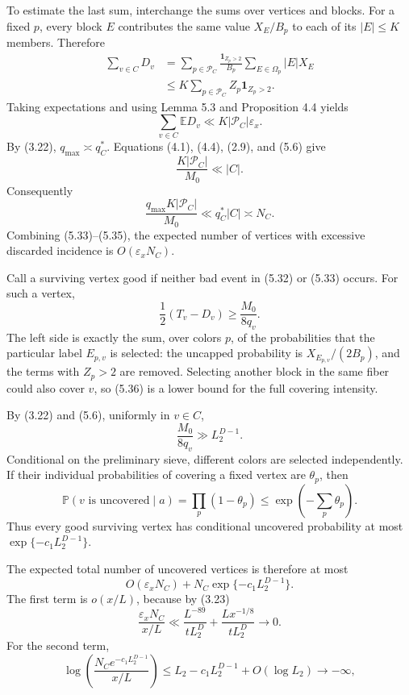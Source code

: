 \documentclass[10pt,letterpaper]{article}
\newcommand{\PP}{\mathbb{P}}
\newcommand{\EE}{\mathbb{E}}
\newcommand{\PC}{\mathcal{P}_C}
\newcommand{\ind}{\mathbf{1}}
\begin{document}
To estimate the last sum, interchange the sums over vertices and blocks. For a fixed $p$, every block $E$
contributes the same value $X_E/B_p$ to each of its $|E|\le K$ members. Therefore
\[
\begin{aligned}
\sum_{v\in C}D_v&=\sum_{p\in\PC}\frac{\ind_{Z_p>2}}{B_p}\sum_{E\in\Omega_p}|E|X_E\\
&\le K\sum_{p\in\PC}Z_p\ind_{Z_p>2}.
\end{aligned}
\]
Taking expectations and using Lemma 5.3 and Proposition 4.4 yields
\begin{equation}
\sum_{v\in C}\EE D_v\ll K|\PC|\varepsilon_x.
\tag{5.34}
\end{equation}
By (3.22), $q_{\max}\asymp q_C^*$. Equations (4.1), (4.4), (2.9), and (5.6) give
\[
\frac{K|\PC|}{M_0}\ll|C|.
\]
Consequently
\begin{equation}
\frac{q_{\max}K|\PC|}{M_0}\ll q_C^*|C|\asymp N_C.
\tag{5.35}
\end{equation}
Combining (5.33)--(5.35), the expected number of vertices with excessive discarded incidence is $O(\varepsilon_xN_C)$.

Call a surviving vertex good if neither bad event in (5.32) or (5.33) occurs. For such a vertex,
\begin{equation}
\frac12(T_v-D_v)\ge\frac{M_0}{8q_v}.
\tag{5.36}
\end{equation}
The left side is exactly the sum, over colors $p$, of the probabilities that the particular label $E_{p,v}$ is selected:
the uncapped probability is $X_{E_{p,v}}/(2B_p)$, and the terms with $Z_p>2$ are removed. Selecting another block in
the same fiber could also cover $v$, so (5.36) is a lower bound for the full covering intensity.

By (3.22) and (5.6), uniformly in $v\in C$,
\begin{equation}
\frac{M_0}{8q_v}\gg L_2^{D-1}.
\tag{5.37}
\end{equation}
Conditional on the preliminary sieve, different colors are selected independently. If their individual probabilities
of covering a fixed vertex are $\theta_p$, then
\begin{equation}
\PP(v\text{ is uncovered}\mid a)=\prod_p(1-\theta_p)
\le\exp\left(-\sum_p\theta_p\right).
\tag{5.38}
\end{equation}
Thus every good surviving vertex has conditional uncovered probability at most $\exp\{-c_1L_2^{D-1}\}$.

The expected total number of uncovered vertices is therefore at most
\begin{equation}
O(\varepsilon_xN_C)+N_C\exp\{-c_1L_2^{D-1}\}.
\tag{5.39}
\end{equation}
The first term is $o(x/L)$, because by (3.23)
\[
\frac{\varepsilon_xN_C}{x/L}
\ll\frac{L^{-89}}{tL_2^D}+\frac{Lx^{-1/8}}{tL_2^D}\longrightarrow0.
\]
For the second term,
\[
\log\left(\frac{N_Ce^{-c_1L_2^{D-1}}}{x/L}\right)
\le L_2-c_1L_2^{D-1}+O(\log L_2)\longrightarrow-\infty,
\]
\end{document}
